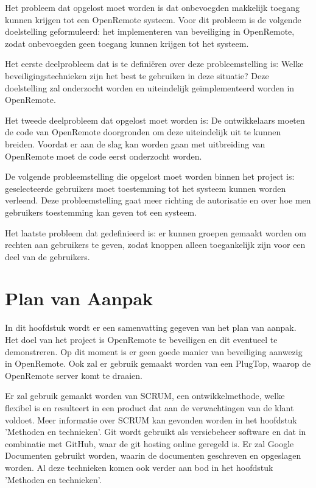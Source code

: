 \documentclass[]{article}
\begin{document}
Het probleem dat opgelost moet worden is dat onbevoegden makkelijk toegang
kunnen krijgen tot een OpenRemote systeem. Voor dit probleem is de
volgende doelstelling geformuleerd: het implementeren van beveiliging in
OpenRemote, zodat onbevoegden geen toegang kunnen krijgen tot het systeem.

Het eerste deelprobleem dat is te defini\"eren over deze probleemstelling is:
Welke beveiligingstechnieken zijn het best te gebruiken in deze situatie?
Deze doelstelling zal onderzocht worden en uiteindelijk ge\"implementeerd worden
in OpenRemote.

Het tweede deelprobleem dat opgelost moet worden is: De ontwikkelaars
moeten de code van OpenRemote doorgronden om deze uiteindelijk uit te
kunnen breiden. Voordat er aan de slag kan worden gaan met uitbreiding van
OpenRemote moet de code eerst onderzocht worden.

De volgende probleemstelling die opgelost moet worden binnen het project
is: geselecteerde gebruikers moet toestemming tot het systeem kunnen worden
verleend. Deze probleemstelling gaat meer richting de autorisatie en over
hoe men gebruikers toestemming kan geven tot een systeem.

Het laatste probleem dat gedefinieerd is: er kunnen groepen gemaakt worden om
rechten aan gebruikers te geven, zodat knoppen alleen toegankelijk zijn voor een
deel van de gebruikers. 

\newpage
\section{Plan van Aanpak}

In dit hoofdstuk wordt er een samenvatting gegeven van het plan van aanpak. Het
doel van het project is OpenRemote  te  beveiligen  en  dit  eventueel  te
demonstreren. Op dit moment is er geen goede manier van beveiliging aanwezig in
OpenRemote. Ook zal er gebruik gemaakt worden van een PlugTop, waarop  de
OpenRemote server komt te draaien.

Er zal gebruik gemaakt worden van  SCRUM, een ontwikkelmethode, welke flexibel
is en resulteert in een product dat  aan de verwachtingen van de klant
voldoet. Meer informatie  over  SCRUM kan gevonden worden in het hoofdstuk
'Methoden en technieken'.  Git wordt gebruikt als versiebeheer software en
dat  in  combinatie  met GitHub, waar de git hosting online geregeld is.  Er
zal  Google  Documenten gebruikt worden, waarin de documenten geschreven en
opgeslagen worden.  Al deze technieken komen ook verder aan bod in het
hoofdstuk  'Methoden  en technieken'.
\end{document}
